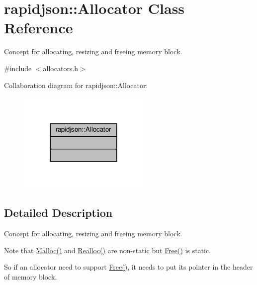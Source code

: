 \hypertarget{classrapidjson_1_1Allocator}{}\section{rapidjson\+:\+:Allocator Class Reference}
\label{classrapidjson_1_1Allocator}


Concept for allocating, resizing and freeing memory block.  




{\ttfamily \#include $<$allocators.\+h$>$}



Collaboration diagram for rapidjson\+:\+:Allocator\+:
\nopagebreak
\begin{figure}[H]
\begin{center}
\leavevmode
\includegraphics[width=180pt]{classrapidjson_1_1Allocator__coll__graph}
\end{center}
\end{figure}


\subsection{Detailed Description}
Concept for allocating, resizing and freeing memory block. 

Note that \hyperlink{allocators_8h_ac93f7ec26fdae5fdb712b0cf43ffaf48}{Malloc()} and \hyperlink{allocators_8h_a0fb2bdf1591ab07b8251eebe71de4b19}{Realloc()} are non-\/static but \hyperlink{allocators_8h_a471c182d62d396b7d5d564e8d6a62d9e}{Free()} is static.

So if an allocator need to support \hyperlink{allocators_8h_a471c182d62d396b7d5d564e8d6a62d9e}{Free()}, it needs to put its pointer in the header of memory block.


